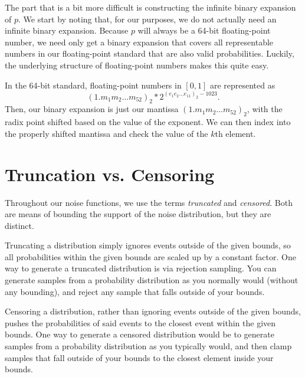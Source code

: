 \documentclass[11pt]{scrartcl} %
\begin{document}
The part that is a bit more difficult is constructing the infinite binary expansion of $p$.
We start by noting that, for our purposes, we do not actually need an infinite binary expansion.
Because $p$ will always be a 64-bit floating-point number, we need only get a binary
expansion that covers all representable numbers in our floating-point standard that are
also valid probabilities.
Luckily, the underlying structure of floating-point numbers makes this quite easy. \newline

In the 64-bit standard, floating-point numbers in $[0,1]$ are represented as
\[ (1.m_1m_2 \hdots m_{52})_2 * 2^{(e_{1}e_2 \hdots e_{11})_2 - 1023}. \]
Then, our binary expansion is just our mantissa $(1.m_1m_2 \hdots m_{52})_2$, with
the radix point shifted based on the value of the exponent.
We can then index into the properly shifted mantissa and check the value of the $k$th element.


\section{Truncation vs. Censoring}
Throughout our noise functions, we use the terms \emph{truncated} and \emph{censored}.
Both are means of bounding the support of the noise distribution, but they are distinct. \newline

Truncating a distribution simply ignores events outside of the given bounds, so
all probabilities within the given bounds are scaled up by a constant factor.
One way to generate a truncated distribution is via rejection sampling.
You can generate samples from a probability distribution as you normally would (without any bounding),
and reject any sample that falls outside of your bounds. \newline

Censoring a distribution, rather than ignoring events outside of the given bounds, pushes the
probabilities of said events to the closest event within the given bounds. One way to generate
a censored distribution would be to generate samples from a probability distribution as you
typically would, and then clamp samples that fall outside of your bounds to the closest element
inside your bounds.





\end{document}
